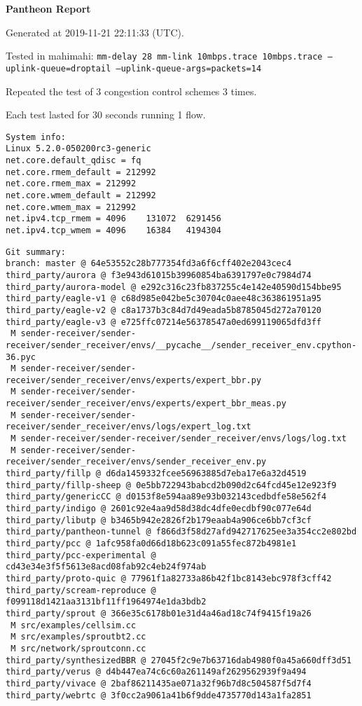 \documentclass{article}
\begin{document}
\centerline{\textbf{\large{Pantheon Report}}}
\vspace{20pt}

Generated at 2019-11-21 22:11:33 (UTC).

Tested in mahimahi: \texttt{mm-delay 28 mm-link 10mbps.trace 10mbps.trace --uplink-queue=droptail --uplink-queue-args=packets=14}

Repeated the test of 3 congestion control schemes 3 times.

Each test lasted for 30 seconds running 1 flow.

\begin{verbatim}
System info:
Linux 5.2.0-050200rc3-generic
net.core.default_qdisc = fq
net.core.rmem_default = 212992
net.core.rmem_max = 212992
net.core.wmem_default = 212992
net.core.wmem_max = 212992
net.ipv4.tcp_rmem = 4096	131072	6291456
net.ipv4.tcp_wmem = 4096	16384	4194304
\end{verbatim}

\begin{verbatim}
Git summary:
branch: master @ 64e53552c28b777354fd3a6f6cff402e2043cec4
third_party/aurora @ f3e943d61015b39960854ba6391797e0c7984d74
third_party/aurora-model @ e292c316c23fb837255c4e142e40590d154bbe95
third_party/eagle-v1 @ c68d985e042be5c30704c0aee48c363861951a95
third_party/eagle-v2 @ c8a1737b3c84d7d49eada5b8785045d272a70120
third_party/eagle-v3 @ e725ffc07214e56378547a0ed699119065dfd3ff
 M sender-receiver/sender-receiver/sender_receiver/envs/__pycache__/sender_receiver_env.cpython-36.pyc
 M sender-receiver/sender-receiver/sender_receiver/envs/experts/expert_bbr.py
 M sender-receiver/sender-receiver/sender_receiver/envs/experts/expert_bbr_meas.py
 M sender-receiver/sender-receiver/sender_receiver/envs/logs/expert_log.txt
 M sender-receiver/sender-receiver/sender_receiver/envs/logs/log.txt
 M sender-receiver/sender-receiver/sender_receiver/envs/sender_receiver_env.py
third_party/fillp @ d6da1459332fcee56963885d7eba17e6a32d4519
third_party/fillp-sheep @ 0e5bb722943babcd2b090d2c64fcd45e12e923f9
third_party/genericCC @ d0153f8e594aa89e93b032143cedbdfe58e562f4
third_party/indigo @ 2601c92e4aa9d58d38dc4dfe0ecdbf90c077e64d
third_party/libutp @ b3465b942e2826f2b179eaab4a906ce6bb7cf3cf
third_party/pantheon-tunnel @ f866d3f58d27afd942717625ee3a354cc2e802bd
third_party/pcc @ 1afc958fa0d66d18b623c091a55fec872b4981e1
third_party/pcc-experimental @ cd43e34e3f5f5613e8acd08fab92c4eb24f974ab
third_party/proto-quic @ 77961f1a82733a86b42f1bc8143ebc978f3cff42
third_party/scream-reproduce @ f099118d1421aa3131bf11ff1964974e1da3bdb2
third_party/sprout @ 366e35c6178b01e31d4a46ad18c74f9415f19a26
 M src/examples/cellsim.cc
 M src/examples/sproutbt2.cc
 M src/network/sproutconn.cc
third_party/synthesizedBBR @ 27045f2c9e7b63716dab4980f0a45a660dff3d51
third_party/verus @ d4b447ea74c6c60a261149af2629562939f9a494
third_party/vivace @ 2baf86211435ae071a32f96b7d8c504587f5d7f4
third_party/webrtc @ 3f0cc2a9061a41b6f9dde4735770d143a1fa2851
\end{verbatim}
\end{document}
